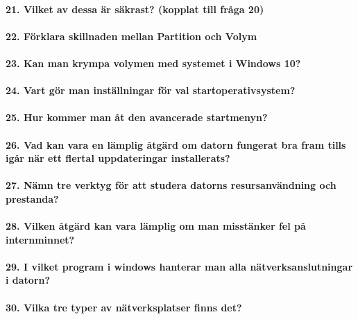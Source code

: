 \paragraph{21. Vilket av dessa är säkrast? (kopplat till fråga 20)}

\paragraph{22. Förklara skillnaden mellan Partition och Volym}

\paragraph{23. Kan man krympa volymen med systemet i Windows 10?}

\paragraph{24. Vart gör man inställningar för val startoperativsystem?}

\paragraph{25. Hur kommer man åt den avancerade startmenyn?}

\paragraph{26. Vad kan vara en lämplig åtgärd om datorn fungerat bra fram tills igår när ett flertal uppdateringar installerats?}

\paragraph{27. Nämn tre verktyg för att studera datorns resursanvändning och prestanda?}

\paragraph{28. Vilken åtgärd kan vara lämplig om man misstänker fel på internminnet?}

\paragraph{29. I vilket program i windows hanterar man alla nätverksanslutningar i datorn?}

\paragraph{30. Vilka tre typer av nätverksplatser finns det?}

